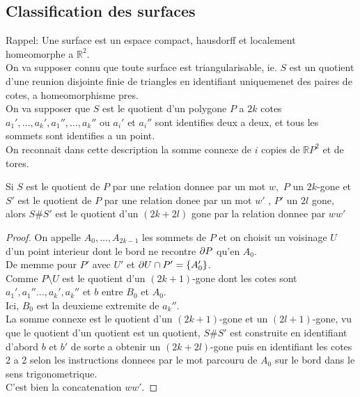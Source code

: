 \documentclass[../main.tex]{subfiles}
\begin{document}
\subsection{Classification des surfaces}
Rappel: Une surface est un espace compact, hausdorff et localement homeomorphe a $ \mathbb{R}^{2}$.\\
On va supposer connu que toute surface est triangularisable, ie. $S$ est un quotient d'une reunion disjointe finie de triangles en identifiant uniquemenet des paires de cotes, a homeomorphisme pres.\\
On va supposer que $S$ est le quotient d'un polygone $P$ a $2k$ cotes $ a_1',\ldots,a_k', a_1'', \ldots, a_k''$ ou $a_i'$ et $a_i''$ sont identifies deux a deux, et tous les sommets sont identifies a un point.\\
On reconnait dans cette description la somme connexe de $i$ copies de $ \mathbb{R}P^{2}$ et de tores.
\begin{propo}
Si $S$ est le quotient de $P$ par une relation donnee par un  mot $w,$ $P$ un $2k$-gone et $S'$ est le quotient de $P$ par une relation donee par un mot $ w'$ , $ P'$ un $2l$ gone, alors $S\# S'$ est le quotient d'un $( 2k+2l) $ gone par la relation donnee par $ww'$
\end{propo}
\begin{proof}
On appelle $A_0, \ldots, A_{2k-1} $ les sommets de $P$ et on choisit un voisinage $U$  d'un point interieur dont le bord ne recontre $\partial P$ qu'en $A_0$.\\
De memme pour $P'$ avec $U'$ et $\partial U \cap P' = \left\{ A_0' \right\} $.\\
Comme $ P\setminus  U$  est le quotient d'un $( 2k+1) $-gone dont les cotes sont $a_1', a_1''\ldots, a_k', a_k''$ et $b$ entre $ B_0$ et $A_0$.\\
Ici, $B_0$ est la deuxieme extremite de $a_k''$.\\
La somme connexe est le quotient d'un $( 2k+1) $-gone et un $ ( 2l+1) $-gone, vu que le quotient d'un quotient est un quotient, $ S\# S'$ est construite en identifiant d'abord $b$ et $b'$ de sorte a obtenir un $( 2k+2l) $-gone puis en identifiant les cotes 2 a 2 selon les instructions donnees par le mot parcouru de $A_0$ sur le bord dans le sens trigonometrique.\\
C'est bien la concatenation $ww'$.
\end{proof}
 
\end{document}
